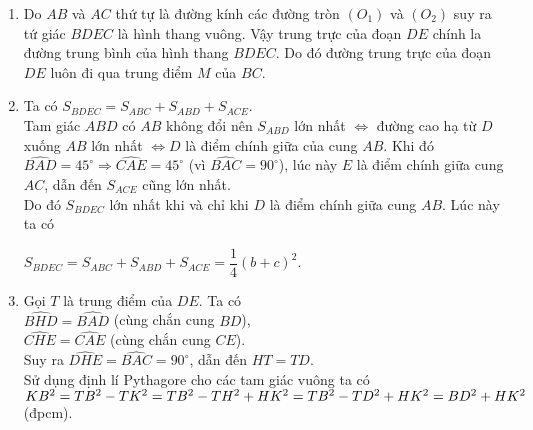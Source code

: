 \begin{ex}
{\begin{center}
		\end{center}
\begin{enumerate}
	\item Do $AB$ và $AC$ thứ tự là đường kính các đường tròn $(O_1)$ và $(O_2)$ suy ra tứ giác $BDEC$ là hình thang vuông. Vậy trung trực của đoạn $DE$ chính la đường trung bình của hình thang $BDEC$. Do đó đường trung trực của đoạn $DE$ luôn đi qua trung điểm $M$ của $BC$.
	\item Ta có $S_{BDEC}=S_{ABC}+S_{ABD}+S_{ACE}$.\\
	Tam giác $ABD$ có $AB$ không đổi nên $S_{ABD}$ lớn nhất $\Leftrightarrow $ đường cao hạ từ $D$ xuống $AB$ lớn nhất $\Leftrightarrow D $ là điểm chính giữa của cung $AB$. Khi đó $\widehat{BAD}=45^\circ\Rightarrow \widehat{CAE}=45^\circ$ (vì $\widehat{BAC}=90^\circ$), lúc này $E$ là điểm chính giữa cung $AC$, dẫn đến $S_{ACE}$ cũng lớn nhất.\\
	Do đó $S_{BDEC}$ lớn nhất khi và chỉ khi $D$ là điểm chính giữa cung $AB$. Lúc này ta có
	\begin{center}
		$S_{BDEC}=S_{ABC}+S_{ABD}+S_{ACE}=\dfrac{1}{4}(b+c)^2$.
	\end{center}
\item Gọi $T$ là trung điểm của $DE$. Ta có\\
$\widehat{BHD}=\widehat{BAD}$ (cùng chắn cung $BD$),\\
$\widehat{CHE}=\widehat{CAE}$ (cùng chắn cung $CE$).\\
Suy ra $\widehat{DHE}=\widehat{BAC}=90^\circ$, dẫn đến $HT=TD$.\\
 Sử dụng định lí Pythagore cho các tam giác vuông ta có\\
$KB^2=TB^2-TK^2=TB^2-TH^2+HK^2\\=TB^2-TD^2+HK^2=BD^2+HK^2$ (đpcm).
\end{enumerate}
}
\end{ex}
